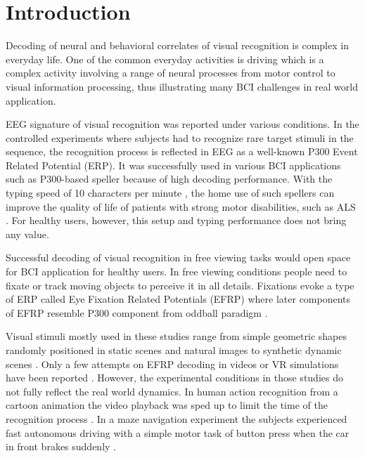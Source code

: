 \documentclass[12pt]{iopart}
\begin{document}

\section{Introduction}
\label{sec:intro}

Decoding of neural and behavioral correlates 
of visual recognition is complex in everyday life.
One of the common everyday activities is driving
which is a complex activity involving 
a range of neural processes from motor control
to visual information processing, thus illustrating
many BCI challenges in real world application.

EEG signature of visual recognition was reported
under various conditions.
In the controlled experiments where subjects had to recognize
rare target stimuli in the sequence, the recognition process
is reflected in EEG as a well-known P300 Event Related Potential (ERP).
It was successfully used in various BCI applications such as
P300-based speller because of high decoding performance.
With the typing speed of 10 characters per minute \cite{rezeika_braincomputer_2018},
the home use of such spellers can improve the quality of life
of patients with strong motor disabilities, such as ALS \cite{sellers_brain-computer_2010,holz_long-term_2015}.
For healthy users, however, this setup and typing performance does not bring any value.

Successful decoding of visual recognition in free viewing tasks
would open space for BCI application for healthy users.
In free viewing conditions people need to fixate
or track moving objects to perceive it in all details.
Fixations evoke a type of ERP called Eye Fixation Related Potentials (EFRP)
where later components of EFRP resemble P300 component from oddball paradigm \cite{}.

Visual stimuli mostly used in these studies range from simple geometric shapes
randomly positioned in static scenes and natural images to synthetic dynamic
scenes \cite{}. Only a few attempts on EFRP decoding in videos or VR simulations
have been reported \cite{}. 
However, the experimental conditions in those studies do not fully
reflect the real world dynamics.
In human action recognition from a cartoon animation the video playback was sped up
to limit the time of the recognition process \cite{}.
In a maze navigation experiment the subjects experienced fast autonomous driving
with a simple motor task of button press when the car in front brakes suddenly \cite{}.
\end{document}
